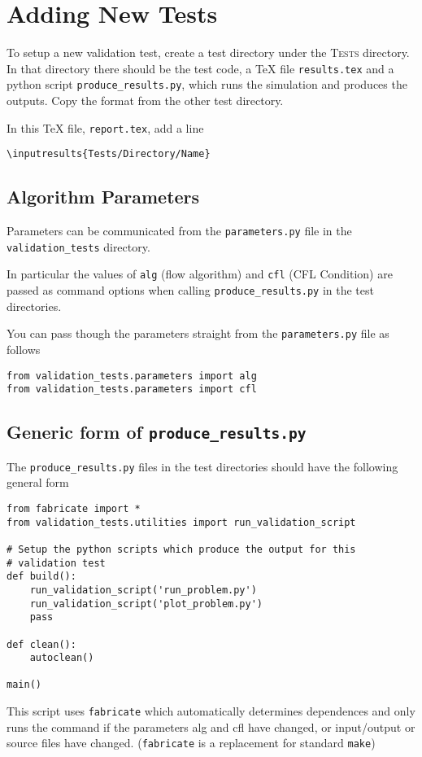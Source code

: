 \documentclass[11pt,a4paper]{report}
\begin{document}
\chapter{Adding New Tests}


To setup a new validation test, create a test directory under the
\textsc{Tests} directory. In that directory there should be the test code, a
\TeX{} file \texttt{results.tex} and a python script
\texttt{produce\_results.py}, which runs the simulation and produces the
outputs. Copy the format from the other test directory. 

In this \TeX{} file, \texttt{report.tex}, add a line
\begin{verbatim}
\inputresults{Tests/Directory/Name}
\end{verbatim}



\section{Algorithm Parameters}
Parameters can be communicated from the \verb|parameters.py|
file in the \verb|validation_tests| directory.

In particular the
values of \verb|alg| (flow algorithm) and \verb|cfl| (CFL Condition)
are passed as command options when calling \verb|produce_results.py| in the
test directories.

You can pass though the parameters straight from the \verb|parameters.py| file as follows
\begin{verbatim}
from validation_tests.parameters import alg
from validation_tests.parameters import cfl
\end{verbatim}

\section{Generic form of \texttt{produce\_results.py}}

The \texttt{produce\_results.py} files in the test directories should have the
following general form

\begin{verbatim}
from fabricate import *
from validation_tests.utilities import run_validation_script

# Setup the python scripts which produce the output for this
# validation test
def build():
    run_validation_script('run_problem.py')
    run_validation_script('plot_problem.py')
    pass

def clean():
    autoclean()

main()
\end{verbatim}
This script uses \texttt{fabricate} which automatically determines dependences
and only runs the command if the parameters alg and cfl have changed,
or input/output or source files have changed. (\texttt{fabricate} is a replacement for
standard \texttt{make})





\end{document}
